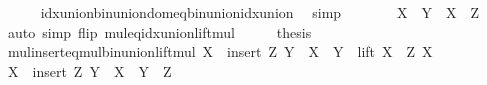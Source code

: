 \begin{isabellebody}
\ \ \ \ \isamarkupfalse%
\ idx{\isacharunderscore}{\kern0pt}union{\isacharunderscore}{\kern0pt}bin{\isacharunderscore}{\kern0pt}union{\isacharunderscore}{\kern0pt}dom{\isacharunderscore}{\kern0pt}eq{\isacharunderscore}{\kern0pt}bin{\isacharunderscore}{\kern0pt}union{\isacharunderscore}{\kern0pt}idx{\isacharunderscore}{\kern0pt}union\ \isamarkupfalse%
\ simp\isanewline
\ \ \isamarkupfalse%
\ \isamarkupfalse%
\ {\isachardoublequoteopen}{\isachardot}{\kern0pt}{\isachardot}{\kern0pt}{\isachardot}{\kern0pt}\ {\isacharequal}{\kern0pt}\ {\isacharparenleft}{\kern0pt}X\ {\isacharasterisk}{\kern0pt}\ Y{\isacharparenright}{\kern0pt}\ {\isasymunion}\ {\isacharparenleft}{\kern0pt}X\ {\isacharasterisk}{\kern0pt}\ Z{\isacharparenright}{\kern0pt}{\isachardoublequoteclose}\ \isamarkupfalse%
\ {\isacharparenleft}{\kern0pt}auto\ simp\ flip{\isacharcolon}{\kern0pt}\ mul{\isacharunderscore}{\kern0pt}eq{\isacharunderscore}{\kern0pt}idx{\isacharunderscore}{\kern0pt}union{\isacharunderscore}{\kern0pt}lift{\isacharunderscore}{\kern0pt}mul{\isacharparenright}{\kern0pt}\isanewline
\ \ \isamarkupfalse%
\ \isamarkupfalse%
\ {\isacharquery}{\kern0pt}thesis\ \isacommand{{\isachardot}{\kern0pt}}\isamarkupfalse%
\isanewline
{}\isamarkupfalse%
%
\endisatagproof
{\isafoldproof}%
%
\isadelimproof
\isanewline
%
\endisadelimproof
\isanewline
{}\isamarkupfalse%
\ mul{\isacharunderscore}{\kern0pt}insert{\isacharunderscore}{\kern0pt}eq{\isacharunderscore}{\kern0pt}mul{\isacharunderscore}{\kern0pt}bin{\isacharunderscore}{\kern0pt}union{\isacharunderscore}{\kern0pt}lift{\isacharunderscore}{\kern0pt}mul{\isacharcolon}{\kern0pt}\ {\isachardoublequoteopen}X\ {\isacharasterisk}{\kern0pt}\ {\isacharparenleft}{\kern0pt}insert\ Z\ Y{\isacharparenright}{\kern0pt}\ {\isacharequal}{\kern0pt}\ {\isacharparenleft}{\kern0pt}X\ {\isacharasterisk}{\kern0pt}\ Y{\isacharparenright}{\kern0pt}\ {\isasymunion}\ lift\ {\isacharparenleft}{\kern0pt}X\ {\isacharasterisk}{\kern0pt}\ Z{\isacharparenright}{\kern0pt}\ X{\isachardoublequoteclose}\isanewline
%
\isadelimproof
%
\endisadelimproof
%
\isatagproof
{}\isamarkupfalse%
\ {\isacharminus}{\kern0pt}\isanewline
\ \ \isamarkupfalse%
\ {\isachardoublequoteopen}X\ {\isacharasterisk}{\kern0pt}\ {\isacharparenleft}{\kern0pt}insert\ Z\ Y{\isacharparenright}{\kern0pt}\ {\isacharequal}{\kern0pt}\ X\ {\isacharasterisk}{\kern0pt}\ {\isacharparenleft}{\kern0pt}Y\ {\isasymunion}\ {\isacharbraceleft}{\kern0pt}Z{\isacharbraceright}{\kern0pt}{\isacharparenright}{\kern0pt}{\isachardoublequoteclose}\ \isamarkupfalse%

\end{isabellebody}
